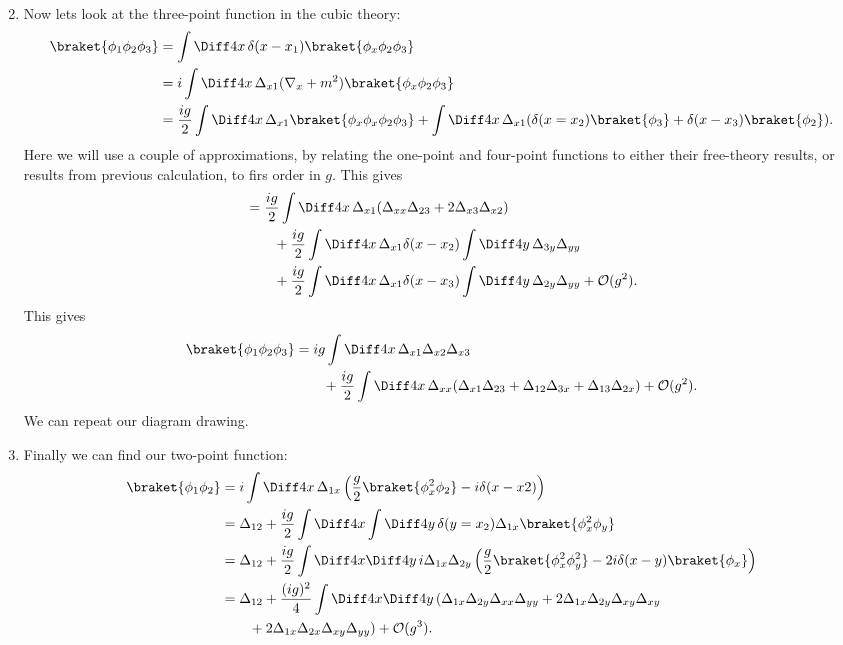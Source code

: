 \documentclass[12pt]{article}
\begin{document}
\begin{exbox}
\begin{enumerate}
\begin{align*}
			\end{align*}
		\item Now lets look at the three-point function in the cubic theory:
			\begin{align*}
				\braket{\phi_1 \phi_2 \phi_3} &= \int \Diff 4 x \, \delta(x - x_1) \braket{\phi_x \phi_2 \phi_3} \\
							      &= i \int \Diff 4 x \, \Delta_{x1} (\nabla_x + m^2) \braket{\phi_x \phi_2 \phi_3} \\
							      &= \frac{ig}{2} \int \Diff 4 x \, \Delta_{x1} \braket{\phi_x \phi_x \phi_2 \phi_3} + \int \Diff 4 x \, \Delta_{x1} (\delta(x = x_2) \braket{\phi_3} + \delta(x - x_3) \braket{\phi_2}).
			\end{align*}
			Here we will use a couple of approximations, by relating the one-point and four-point functions to either their free-theory results, or results from previous calculation, to firs order in $g$. This gives
			\begin{align*}
				&= \frac{ig}{2} \int \Diff 4 x\, \Delta_{x1}(\Delta_{xx} \Delta_{23} + 2 \Delta_{x3} \Delta_{x2}) \\
				& \qquad+ \frac{ig}{2} \int \Diff 4 x \, \Delta_{x1} \delta(x - x_2) \int \Diff 4 y \, \Delta_{3y} \Delta_{yy} \\
				&\qquad + \frac{ig}{2} \int \Diff 4 x \, \Delta_{x1} \delta(x - x_3) \int \Diff 4 y \, \Delta_{2y} \Delta_{yy} + \mathcal{O}(g^2).
			\end{align*}
			This gives
			\begin{align*}
				\braket{\phi_1 \phi_2 \phi_3} &= ig \int \Diff4 x\, \Delta_{x1} \Delta_{x2} \Delta_{x3} \\
				&\qquad + \frac{ig}{2} \int \Diff 4 x \, \Delta_{xx} (\Delta_{x1} \Delta_{23} + \Delta_{12} \Delta_{3x} + \Delta_{13} \Delta_{2x}) + \mathcal{O}(g^2).
			\end{align*}
			We can repeat our diagram drawing.
		\item Finally we can find our two-point function:
			\begin{align*}
				\braket{\phi_1 \phi_2} &= i \int \Diff 4 x \, \Delta_{1x} \left( \frac{g}{2} \braket{ \phi_x^2 \phi_2} - i \delta(x - x2) \right) \\
						       &= \Delta_{12} + \frac{ig}{2} \int \Diff 4 x \int \Diff 4 y \, \delta(y = x_2) \Delta_{1x} \braket{\phi_x^2 \phi_y} \\
						       &= \Delta_{12} + \frac{ig}{2} \int \Diff4 x \Diff 4 y \, i \Delta_{1x} \Delta_{2y} \left( \frac{g}{2} \braket{\phi_x^2 \phi_y^2} - 2i \delta(x - y) \braket{\phi_x}\right) \\
						       &= \Delta_{12} + \frac{(ig)^2}{4} \int \Diff 4 x \Diff 4 y \, (\Delta_{1x} \Delta_{2y} \Delta_{xx} \Delta_{yy} + 2 \Delta_{1x} \Delta_{2y} \Delta_{xy} \Delta_{xy} \\
						       & \qquad + 2 \Delta_{1x} \Delta_{2x} \Delta_{xy} \Delta_{yy}) + \mathcal{O}(g^3).
			\end{align*}
	\end{enumerate}
	
\end{exbox}
\end{document}
